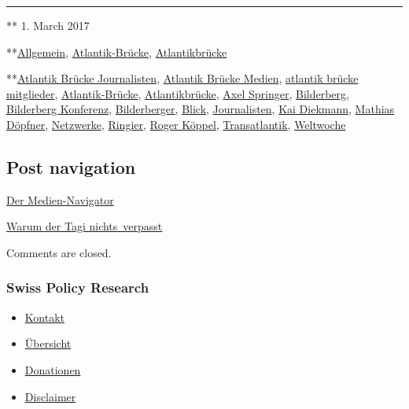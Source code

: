 \begin{center}\rule{0.5\linewidth}{\linethickness}\end{center}

** 1. March 2017

**\href{https://swprs.org/category/allgemein/}{Allgemein},
\href{https://swprs.org/category/atlantik-bruecke/}{Atlantik-Brücke},
\href{https://swprs.org/category/atlantikbruecke/}{Atlantikbrücke}

**\href{https://swprs.org/tag/atlantik-bruecke-journalisten/}{Atlantik
Brücke Journalisten},
\href{https://swprs.org/tag/atlantik-bruecke-medien/}{Atlantik Brücke
Medien},
\href{https://swprs.org/tag/atlantik-bruecke-mitglieder/}{atlantik
brücke mitglieder},
\href{https://swprs.org/tag/atlantik-bruecke/}{Atlantik-Brücke},
\href{https://swprs.org/tag/atlantikbruecke/}{Atlantikbrücke},
\href{https://swprs.org/tag/axel-springer/}{Axel Springer},
\href{https://swprs.org/tag/bilderberg/}{Bilderberg},
\href{https://swprs.org/tag/bilderberg-konferenz/}{Bilderberg
Konferenz}, \href{https://swprs.org/tag/bilderberger/}{Bilderberger},
\href{https://swprs.org/tag/blick/}{Blick},
\href{https://swprs.org/tag/journalisten/}{Journalisten},
\href{https://swprs.org/tag/kai-diekmann/}{Kai Diekmann},
\href{https://swprs.org/tag/mathias-doepfner/}{Mathias Döpfner},
\href{https://swprs.org/tag/netzwerke/}{Netzwerke},
\href{https://swprs.org/tag/ringier/}{Ringier},
\href{https://swprs.org/tag/roger-koeppel/}{Roger Köppel},
\href{https://swprs.org/tag/transatlantik/}{Transatlantik},
\href{https://swprs.org/tag/weltwoche/}{Weltwoche}

\hypertarget{post-navigation}{%
\subsection{Post navigation}\label{post-navigation}}

\href{https://swprs.org/2017/03/01/der-medien-navigator/}{Der
Medien-Navigator}

\href{https://swprs.org/2017/03/01/warum-der-tagesanzeiger-nichts-verpasst/}{Warum
der Tagi nichts~verpasst}

Comments are closed.

\hypertarget{swiss-policy-research}{%
\subsubsection{Swiss Policy Research}\label{swiss-policy-research}}

\begin{itemize}
\tightlist
\item
  \href{https://swprs.org/kontakt/}{Kontakt}
\item
  \href{https://swprs.org/uebersicht/}{Übersicht}
\item
  \href{https://swprs.org/donationen/}{Donationen}
\item
  \href{https://swprs.org/disclaimer/}{Disclaimer}
\end{itemize}


